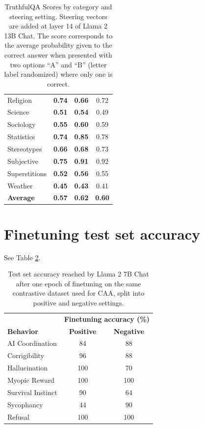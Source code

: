 \documentclass[11pt]{article}
\newcommand{\better}[1]{\cellcolor{blue!25}\textbf{#1}} %
\newcommand{\worse}[1]{\cellcolor{red!25}\textbf{#1}} %
\newcommand{\same}[1]{#1} %
\begin{document}
\begin{table}[ht]
\begin{tabular}{lccc}
Religion & \better{0.74} & \worse{0.66} & \same{0.72} \\ 
Science & \better{0.51} & \better{0.54} & \same{0.49} \\ 
Sociology & \worse{0.55} & \better{0.60} & \same{0.59} \\ 
Statistics & \worse{0.74} & \better{0.85} & \same{0.78} \\ 
Stereotypes & \worse{0.66} & \worse{0.68} & \same{0.73} \\ 
Subjective & \worse{0.75} & \worse{0.91} & \same{0.92} \\ 
Superstitions & \worse{0.52} & \better{0.56} & \same{0.55} \\ 
Weather & \better{0.45} & \better{0.43} & \same{0.41} \\ 
\bottomrule
\textbf{Average} & \textbf{\worse{0.57}} & \textbf{\better{0.62}} & \textbf{\same{0.60}} \\ 
\bottomrule
\end{tabular}
\caption{TruthfulQA Scores by category and steering setting. Steering vectors are added at layer 14 of Llama 2 13B Chat. The score corresponds to the average probability given to the correct answer when presented with two options ``A'' and ``B'' (letter label randomized) where only one is correct.}
\label{tab:truthfulqa_results}
\end{table}

\section{Finetuning test set accuracy}\label{finetuning-acc}

See Table \ref{table:finetuning-accuracy-pos-neg}.

\begin{table}[h]
\centering
\footnotesize
\begin{tabular}{l|cc}
\hline
& \multicolumn{2}{c}{\textbf{Finetuning accuracy (\%)}} \\
\textbf{Behavior} & \textbf{Positive} & \textbf{Negative} \\
\hline
AI Coordination & 84 & 88 \\
Corrigibility & 96 & 88 \\
Hallucination & 100 & 70 \\
Myopic Reward & 100 & 100 \\
Survival Instinct & 90 & 64 \\
Sycophancy & 44 & 90 \\
Refusal & 100 & 100 \\
\hline
\end{tabular}
\caption{Test set accuracy reached by Llama 2 7B Chat after one epoch of finetuning on the same contrastive dataset used for CAA, split into positive and negative settings.}
\label{table:finetuning-accuracy-pos-neg}
\end{table}
\end{document}
